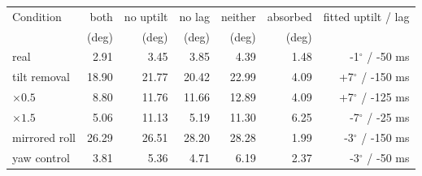 \footnotesize
\begin{tabular}{lrrrrrr}
\toprule
Condition & both & no uptilt & no lag & neither & absorbed & fitted uptilt / lag \\
 & (deg) & (deg) & (deg) & (deg) & (deg) & \\
\midrule
real & 2.91 & 3.45 & 3.85 & 4.39 & 1.48 & -1$^\circ$ / -50 ms \\
tilt removal & 18.90 & 21.77 & 20.42 & 22.99 & 4.09 & +7$^\circ$ / -150 ms \\
$\times 0.5$ & 8.80 & 11.76 & 11.66 & 12.89 & 4.09 & +7$^\circ$ / -125 ms \\
$\times 1.5$ & 5.06 & 11.13 & 5.19 & 11.30 & 6.25 & -7$^\circ$ / -25 ms \\
mirrored roll & 26.29 & 26.51 & 28.20 & 28.28 & 1.99 & -3$^\circ$ / -150 ms \\
yaw control & 3.81 & 5.36 & 4.71 & 6.19 & 2.37 & -3$^\circ$ / -50 ms \\
\bottomrule
\end{tabular}
